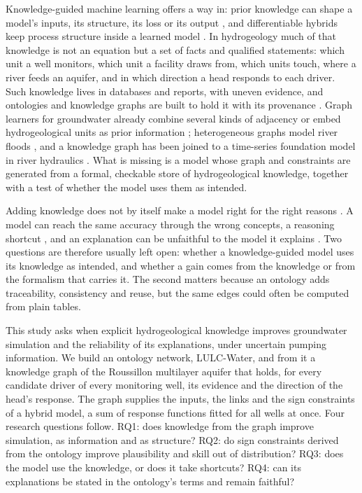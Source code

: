 Knowledge-guided machine learning offers a way in: prior knowledge can shape a model's inputs, its
structure, its loss or its output \citep{Karpatne2017Theorya,Vonrueden2021Informeda,
Willard2022Integrating,Xu2024Physics}, and differentiable hybrids keep process structure inside a
learned model \citep{Shen2023Differentiable,Feng2022Differentiable}. In hydrogeology much of that
knowledge is not an equation but a set of facts and qualified statements: which unit a well
monitors, which unit a facility draws from, which units touch, where a river feeds an aquifer, and
in which direction a head responds to each driver. Such knowledge lives in databases and reports,
with uneven evidence, and ontologies and knowledge graphs are built to hold it with its provenance
\citep{Brodaric2018Enabling,Janowicz2022Know,Lippolis2025The}. Graph learners for groundwater already
combine several kinds of adjacency \citep{Wu2025Forecasting} or embed hydrogeological units as prior
information \citep{Wu2025Graph}; heterogeneous graphs model river floods \citep{Sarkar2025Hydrogat},
and a knowledge graph has been joined to a time-series foundation model in river hydraulics
\citep{Holmberg2026Knowledge}. What is missing is a model whose graph and constraints are generated
from a formal, checkable store of hydrogeological knowledge, together with a test of whether the
model uses them as intended.

Adding knowledge does not by itself make a model right for the right reasons
\citep{Ross2017Righta}. A model can reach the same accuracy through the wrong concepts, a reasoning
shortcut \citep{Marconato2023Not,Marconato2024Bears}, and an explanation can be unfaithful to the
model it explains \citep{Azzolin2025Reconsidering}. Two questions are therefore usually left open:
whether a knowledge-guided model uses its knowledge as intended, and whether a gain comes from the
knowledge or from the formalism that carries it. The second matters because an ontology adds
traceability, consistency and reuse, but the same edges could often be computed from plain tables.

This study asks when explicit hydrogeological knowledge improves groundwater simulation and the
reliability of its explanations, under uncertain pumping information. We build an ontology network,
LULC-Water, and from it a knowledge graph of the Roussillon multilayer aquifer that holds, for every
candidate driver of every monitoring well, its evidence and the direction of the head's response.
The graph supplies the inputs, the links and the sign constraints of a hybrid model, a sum of
response functions fitted for all wells at once. Four research questions follow. RQ1: does knowledge
from the graph improve simulation, as information and as structure? RQ2: do sign constraints derived
from the ontology improve plausibility and skill out of distribution? RQ3: does the model use the
knowledge, or does it take shortcuts? RQ4: can its explanations be stated in the ontology's terms and
remain faithful?

